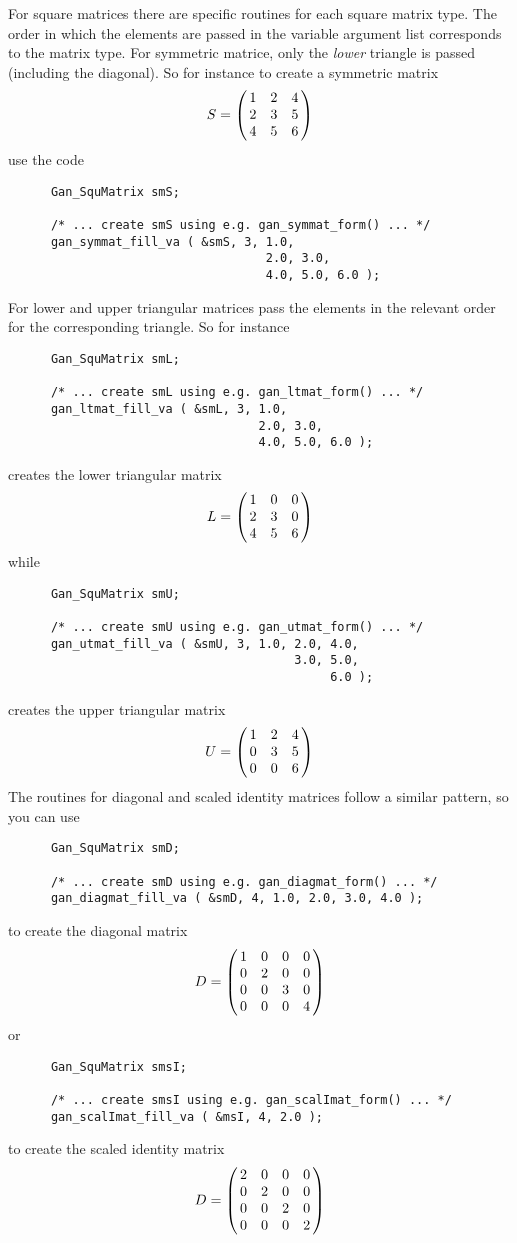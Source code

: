For square matrices there are specific routines for each square matrix
type. The order in which the elements are passed in the variable argument
list corresponds to the matrix type. For symmetric matrice, only the
{\em lower} triangle is passed (including the diagonal). So for instance
to create a symmetric matrix
\[ S = \beginm{ccc} 1 & 2 & 4 \\ 2 & 3 & 5 \\ 4 & 5 & 6 \endm
\]
use the code     
\begin{verbatim}
      Gan_SquMatrix smS;

      /* ... create smS using e.g. gan_symmat_form() ... */
      gan_symmat_fill_va ( &smS, 3, 1.0,
                                    2.0, 3.0,
                                    4.0, 5.0, 6.0 );
\end{verbatim}
For lower and upper triangular matrices pass the elements in the relevant order
for the corresponding triangle. So for instance
\begin{verbatim}
      Gan_SquMatrix smL;

      /* ... create smL using e.g. gan_ltmat_form() ... */
      gan_ltmat_fill_va ( &smL, 3, 1.0,
                                   2.0, 3.0,
                                   4.0, 5.0, 6.0 );
\end{verbatim}
creates the lower triangular  matrix
\[ L = \beginm{ccc} 1 & 0 & 0 \\ 2 & 3 & 0 \\ 4 & 5 & 6 \endm
\]
while
\begin{verbatim}
      Gan_SquMatrix smU;

      /* ... create smU using e.g. gan_utmat_form() ... */
      gan_utmat_fill_va ( &smU, 3, 1.0, 2.0, 4.0,
                                        3.0, 5.0,
                                             6.0 );
\end{verbatim}
creates the upper triangular  matrix
\[ U = \beginm{ccc} 1 & 2 & 4 \\ 0 & 3 & 5 \\ 0 & 0 & 6 \endm
\]
The routines for diagonal and scaled identity matrices follow a similar
pattern, so you can use
\begin{verbatim}
      Gan_SquMatrix smD;

      /* ... create smD using e.g. gan_diagmat_form() ... */
      gan_diagmat_fill_va ( &smD, 4, 1.0, 2.0, 3.0, 4.0 );
\end{verbatim}
to create the diagonal matrix
\[ D = \beginm{cccc} 1 & 0 & 0 & 0 \\ 0 & 2 & 0 & 0 \\ 0 & 0 & 3 & 0 \\ 0 & 0 & 0 & 4 \endm
\]
or
\begin{verbatim}
      Gan_SquMatrix smsI;

      /* ... create smsI using e.g. gan_scalImat_form() ... */
      gan_scalImat_fill_va ( &msI, 4, 2.0 );
\end{verbatim}
to create the scaled identity matrix
\[ D = \beginm{cccc} 2 & 0 & 0 & 0 \\ 0 & 2 & 0 & 0 \\ 0 & 0 & 2 & 0 \\ 0 & 0 & 0 & 2 \endm
\]

